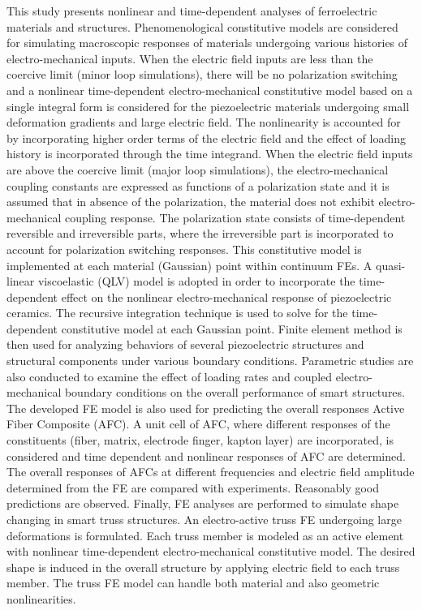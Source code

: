 This study presents nonlinear and time-dependent analyses of ferroelectric materials and structures. Phenomenological constitutive models are considered for simulating macroscopic responses of materials undergoing various histories of electro-mechanical inputs. When the electric field inputs are less than the coercive limit (minor loop simulations), there will be no polarization switching and a nonlinear time-dependent electro-mechanical constitutive model based on a single integral form is considered for the piezoelectric materials undergoing small deformation gradients and large electric field. The nonlinearity is accounted for by incorporating higher order terms of the electric field and the effect of loading history is incorporated through the time integrand. When the electric field inputs are above the coercive limit (major loop simulations), the electro-mechanical coupling constants are expressed as functions of a polarization state and it is assumed that in absence of the polarization, the material does not exhibit electro-mechanical coupling response. The polarization state consists of time-dependent reversible and irreversible parts, where the irreversible part is incorporated to account for polarization switching responses. This constitutive model is implemented at each material (Gaussian) point within continuum FEs. A quasi-linear viscoelastic (QLV) model is adopted in order to incorporate the time-dependent effect on the nonlinear electro-mechanical response of piezoelectric ceramics. The recursive integration technique is used to solve for the time-dependent constitutive model at each Gaussian point. Finite element method is then used for analyzing behaviors of several piezoelectric structures and structural components under various boundary conditions. Parametric studies are also conducted to examine the effect of loading rates and coupled electro-mechanical boundary conditions on the overall performance of smart structures. The developed FE model is also used for predicting the overall responses Active Fiber Composite (AFC). A unit cell of AFC, where different responses of the constituents (fiber, matrix, electrode finger, kapton layer) are incorporated, is considered and time dependent and nonlinear responses of AFC are determined. The overall responses of AFCs at different frequencies and electric field amplitude determined from the FE are compared with experiments. Reasonably good predictions are observed. Finally, FE analyses are performed to simulate shape changing in smart truss structures. An electro-active truss FE undergoing large deformations is formulated. Each truss member is modeled as an active element with nonlinear time-dependent electro-mechanical constitutive model. The desired shape is induced in the overall structure by applying electric field to each truss member. The truss FE model can handle both material and also geometric nonlinearities. 



